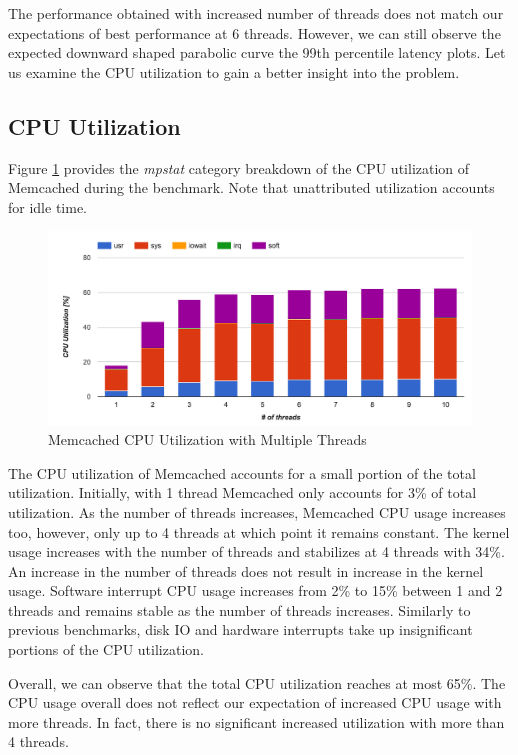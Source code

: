 The performance obtained with increased number of threads does not match our expectations of best performance at 6 threads. However, we can still observe the expected downward shaped parabolic curve the 99th percentile latency plots. Let us examine the CPU utilization to gain a better insight into the problem.


\subsection{CPU Utilization}

Figure \ref{fig:m_threads_cpu} provides the \textit{mpstat} category breakdown of the CPU utilization of Memcached during the benchmark. Note that unattributed utilization accounts for idle time.

\begin{figure}[h]
    \includegraphics[width=\textwidth]{./res2/m_threads_cpu.png}
    \caption{Memcached CPU Utilization with Multiple Threads}
    \label{fig:m_threads_cpu}
\end{figure}

The CPU utilization of Memcached accounts for a small portion of the total utilization. Initially, with 1 thread Memcached only accounts for 3\% of total utilization. As the number of threads increases, Memcached CPU usage increases too, however, only up to 4 threads at which point it remains constant.
The kernel usage increases with the number of threads and stabilizes at 4 threads with 34\%. An increase in the number of threads does not result in increase in the kernel usage.
Software interrupt CPU usage increases from 2\% to 15\% between 1 and 2 threads and remains stable as the number of threads increases.
Similarly to previous benchmarks, disk IO and hardware interrupts take up insignificant portions of the CPU utilization.

Overall, we can observe that the total CPU utilization reaches at most 65\%. The CPU usage overall does not reflect our expectation of increased CPU usage with more threads. In fact, there is no significant increased utilization with more than 4 threads.


